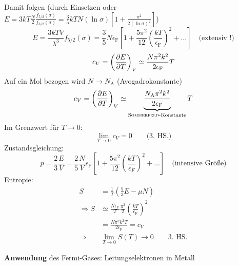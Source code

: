 \begin{enumerate}[A)]
\begin{enumerate}[i)]
        Damit folgen (durch Einsetzen oder \\
        $E = 3 k T \frac{N}{2} \frac{f_{5/2}(\sigma)}{f_{3/2}(\sigma)}=\frac{3}{5} k T N (\ln \sigma) \left[ 1 + \frac{\pi^2}{2 (\ln \sigma)^2} \right]$)
        \begin{equation}
            E = \frac{3 k T V}{\lambda^3} f_{5/2} (\sigma) = \frac{3}{5} N \epsilon_\text{F} \left[ 1 + \frac{5 \pi^2}{12} \left( \frac{k T}{\epsilon_\text{F}} \right)^2 + \ldots \right] \quad \text{(extensiv !)}
        \end{equation}
        \begin{equation}
            c_V = \left( \frac{\partial E}{\partial T} \right)_{V} \simeq \frac{N \pi^2 k^2}{2 \epsilon_\text{F}} T
        \end{equation}
        Auf ein Mol bezogen wird $N \to N_\text{A}$ (Avogadrokonstante)
        \begin{equation}
            c_V = \left( \frac{\partial E}{\partial T} \right)_{V} \simeq \underbrace{\frac{N_\text{A} \pi^2 k^2}{2 \epsilon_\text{F}}}_{\text{\textsc{Sommerfeld}-Konstante}} T
        \end{equation}
        Im Grenzwert für $T \to 0$:
        \begin{equation}
            \lim_{T \to 0} c_V = 0 \qquad \text{(3. HS.)}
        \end{equation}
        Zustandsgleichung:
        \begin{equation}
            p = \frac{2}{3} \frac{E}{V} = \frac{2}{5} \frac{N}{V} \epsilon_\text{F} \left[ 1 + \frac{5 \pi^2}{12} \left( \frac{k T}{\epsilon_F} \right)^2 + \ldots \right] \quad \text{(intensive Größe)}
        \end{equation}
        Entropie:
        \begin{equation}
            \begin{split}
                S &= \frac{1}{T} \left( \frac{5}{3} E - \mu N \right) \\
                \Rightarrow S &\simeq \frac{N \epsilon_\text{F}}{T} \frac{\pi^2}{2} \left( \frac{k T}{\epsilon_\text{F}} \right)^2 \\
                &= \frac{N \pi^2 k^2 T}{2 \epsilon_\text{F}} = c_V \\
                \Rightarrow & \lim_{T \to 0} S(T) \to 0 \qquad \text{3. HS.}
            \end{split}
        \end{equation}
    \end{enumerate}
    \textbf{Anwendung} des Fermi-Gases: Leitungselektronen in Metall \\

\end{enumerate}
